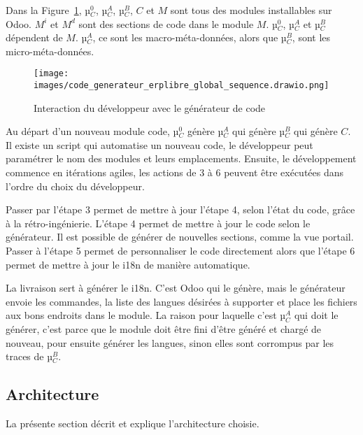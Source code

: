 Dans la Figure~\ref{fig:dia_sequence_gc}, µ$_C^0$, µ$_C^A$, µ$_C^B$, $C$ et $M$ sont tous des modules installables sur Odoo. $M^i$ et $M^d$ sont des sections de code dans le module $M$. µ$_C^0$, µ$_C^A$ et µ$_C^B$ dépendent de $M$. µ$_C^A$, ce sont les macro-méta-données, alors que µ$_C^B$, sont les micro-méta-données.

\begin{figure}
\centering
\texttt{[image: images/code\_generateur\_erplibre\_global\_sequence.drawio.png]}
\caption{Interaction du développeur avec le générateur de code}
\label{fig:dia_sequence_gc}
\end{figure}

Au départ d’un nouveau module code, µ$_C^0$ génère µ$_C^A$ qui génère µ$_C^B$ qui génère $C$. Il existe un script qui automatise un nouveau code, le développeur peut paramétrer le nom des modules et leurs emplacements. Ensuite, le développement commence en itérations agiles, les actions de 3 à 6 peuvent être exécutées dans l’ordre du choix du développeur.

Passer par l’étape 3 permet de mettre à jour l’étape 4, selon l’état du code, grâce à la rétro-ingénierie. L’étape 4 permet de mettre à jour le code selon le générateur. Il est possible de générer de nouvelles sections, comme la vue portail. Passer à l’étape 5 permet de personnaliser le code directement alors que l’étape 6 permet de mettre à jour le i18n de manière automatique.

La livraison sert à générer le i18n. C’est Odoo qui le génère, mais le générateur envoie les commandes, la liste des langues désirées à supporter et place les fichiers aux bons endroits dans le module. La raison pour laquelle c’est µ$_C^A$ qui doit le générer, c’est parce que le module doit être fini d’être généré et chargé de nouveau, pour ensuite générer les langues, sinon elles sont corrompus par les traces de µ$_C^B$.


\subsection{Architecture}\label{architecture_result}
La présente section décrit et explique l'architecture choisie.

